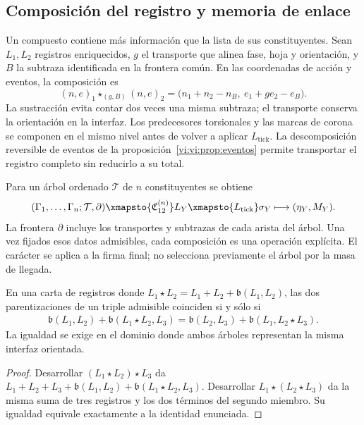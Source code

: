 \subsection{Composición del registro y memoria de enlace}
\label{vi:vi:subsec:composicion-registro}

Un compuesto contiene más información que la lista de sus
constituyentes. Sean \(L_1,L_2\) registros enriquecidos, \(g\) el
transporte que alinea fase, hoja y orientación, y \(B\) la subtraza
identificada en la frontera común. En las coordenadas de acción y
eventos, la composición es
\begin{equation}
 (n,e)_1\star_{(g,B)}(n,e)_2
 =\bigl(n_1+n_2-n_B,\ e_1+ge_2-e_B\bigr).
 \label{vi:vi:eq:composicion-frontera}
\end{equation}
La sustracción evita contar dos veces una misma subtraza; el transporte
conserva la orientación en la interfaz. Los predecesores torsionales y
las marcas de corona se componen en el mismo nivel antes de volver a
aplicar \(L_{\mathrm{tick}}\). La descomposición reversible de eventos
de la proposición~\ref{vi:vi:prop:eventos} permite transportar el registro
completo sin reducirlo a su total.

Para un árbol ordenado \(\mathcal T\) de \(n\) constituyentes se obtiene
\begin{equation}
 (\Gamma_1,\ldots,\Gamma_n;\mathcal T,\partial)
 \xmapsto{\mathfrak C_{12}^{(n)}}L_Y
 \xmapsto{L_{\mathrm{tick}}}\sigma_Y
 \longmapsto (\eta_Y,M_Y).
 \label{vi:vi:eq:cadena-compuesto}
\end{equation}
La frontera \(\partial\) incluye los transportes y subtrazas de cada
arista del árbol. Una vez fijados esos datos admisibles, cada composición
es una operación explícita. El carácter se aplica a la firma final;
no selecciona previamente el árbol por la masa de llegada.

\begin{proposition}
\label{vi:vi:prop:cociclo-compuesto}
En una carta de registros donde
\(L_1\star L_2=L_1+L_2+\mathfrak b(L_1,L_2)\), las dos
parentizaciones de un triple admisible coinciden si y sólo si
\begin{align*}
 \mathfrak b(L_1,L_2)+\mathfrak b(L_1\star L_2,L_3)
 =\mathfrak b(L_2,L_3)+\mathfrak b(L_1,L_2\star L_3).
\end{align*}
La igualdad se exige en el dominio donde ambos árboles representan la
misma interfaz orientada.
\end{proposition}
\begin{proof}
Desarrollar \((L_1\star L_2)\star L_3\) da
\(L_1+L_2+L_3+\mathfrak b(L_1,L_2)+\mathfrak b(L_1\star L_2,L_3)\).
Desarrollar \(L_1\star(L_2\star L_3)\) da la misma suma de tres
registros y los dos términos del segundo miembro. Su igualdad equivale
exactamente a la identidad enunciada.
\end{proof}

